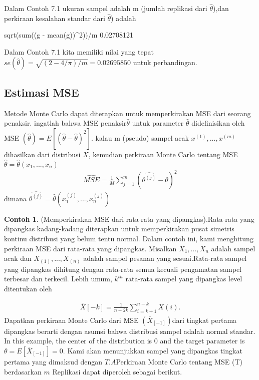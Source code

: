 \documentclass[a4paper,12pt]{article}
\theoremstyle{definition}
\newtheorem{example}{Contoh}[section]
\begin{document}
Dalam Contoh 7.1 ukuran sampel adalah m (jumlah replikasi dari $\hat{\theta}$),dan perkiraan kesalahan standar dari $\hat{\theta}$) adalah

\begin{spverbatim}
    sqrt(sum((g - mean(g))^2))/m
    0.02708121
\end{spverbatim}

Dalam Contoh 7.1 kita memiliki nilai yang tepat $se(\hat{\theta})=\sqrt{(2-4/\pi)/m}=0.02695850$ untuk perbandingan.

\subsection{Estimasi MSE}
Metode Monte Carlo dapat diterapkan untuk memperkirakan MSE dari seorang penaksir. ingatlah bahwa MSE penaksir$\hat{\theta}$ untuk parameter $\hat{\theta}$ didefinisikan oleh MSE $\left ( \hat{\theta } \right )= E \left [ (\hat{\theta}-\hat{\theta})^{2} \right]$. kalau m (pseudo) sampel acak $x^{(1)},...,x^{(m)}$ dihasilkan dari distribusi $X$,  kemudian perkiraan Monte Carlo tentang MSE $\hat{\theta}=\hat{\theta}(x_{1},...,x_{n})$ 
\begin{align*}
    \widehat{MSE} = \frac{1}{M}\sum_{j=1}^{m}(\hat{\theta^{(j)}}-\theta)^{2}
\end{align*}
dimana $\hat{\theta^{(j)}}=\hat{\theta}(x_{1}^{(j)},...,x_{n}^{(j)})$
\begin{example}
    (Memperkirakan MSE dari rata-rata yang dipangkas).Rata-rata yang dipangkas kadang-kadang diterapkan untuk memperkirakan pusat simetris kontinu distribusi yang belum tentu normal. Dalam contoh ini, kami menghitung perkiraan MSE dari rata-rata yang dipangkas. Misalkan $X_{1},...,X_{n}$ adalah sampel acak dan $X_{(1)},...,X_{(n)}$ adalah sampel pesanan yang sesuai.Rata-rata sampel yang dipangkas dihitung dengan rata-rata semua kecuali pengamatan sampel terbesar dan terkecil. Lebih umum, $k^{th}$ rata-rata sampel yang dipangkas level ditentukan
oleh
\end{example}
\begin{align*}
    \overline{X}\left [ -k \right ]=\frac{1}{n-2k}\sum_{i=k+1}^{n-k}X\left ( i \right ).
\end{align*}
Dapatkan perkiraan Monte Carlo dari MSE $(\overline{X}_{\left [ -1 \right ]})$dari tingkat pertama dipangkas berarti dengan asumsi bahwa distribusi sampel adalah normal standar.
In this example, the center of the distribution is $0$ and the target parameter is $\theta =E\left [ \overline{X}_{\left [ -1 \right ]} \right ]=0$. Kami akan menunjukkan sampel yang dipangkas tingkat pertama yang dimaksud dengan $T.A$Perkiraan Monte Carlo tentang MSE (T) berdasarkan $m$ Replikasi dapat diperoleh sebagai berikut.
\end{document}
